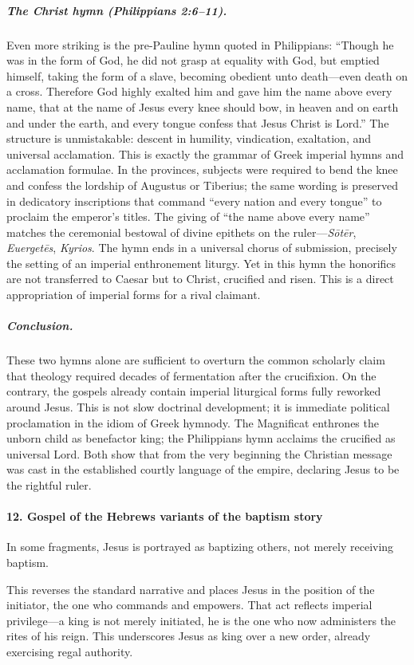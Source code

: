 \subparagraph{The Christ hymn (Philippians 2:6–11).}
Even more striking is the pre-Pauline hymn quoted in Philippians:
“Though he was in the form of God, he did not grasp at equality with God,
but emptied himself, taking the form of a slave,
becoming obedient unto death—even death on a cross.
Therefore God highly exalted him
and gave him the name above every name,
that at the name of Jesus every knee should bow,
in heaven and on earth and under the earth,
and every tongue confess that Jesus Christ is Lord.”
The structure is unmistakable: descent in humility, vindication, exaltation, and universal acclamation.
This is exactly the grammar of Greek imperial hymns and acclamation formulae.
In the provinces, subjects were required to bend the knee and confess the lordship of Augustus or Tiberius; the same wording is preserved in dedicatory inscriptions that command “every nation and every tongue” to proclaim the emperor’s titles.
The giving of “the name above every name” matches the ceremonial bestowal of divine epithets on the ruler—\emph{Sōtēr}, \emph{Euergetēs}, \emph{Kyrios}.
The hymn ends in a universal chorus of submission, precisely the setting of an imperial enthronement liturgy.
Yet in this hymn the honorifics are not transferred to Caesar but to Christ, crucified and risen.
This is a direct appropriation of imperial forms for a rival claimant.

\subparagraph{Conclusion.}
These two hymns alone are sufficient to overturn the common scholarly claim that theology required decades of fermentation after the crucifixion.
On the contrary, the gospels already contain imperial liturgical forms fully reworked around Jesus.
This is not slow doctrinal development; it is immediate political proclamation in the idiom of Greek hymnody.
The Magnificat enthrones the unborn child as benefactor king; the Philippians hymn acclaims the crucified as universal Lord.
Both show that from the very beginning the Christian message was cast in the established courtly language of the empire, declaring Jesus to be the rightful ruler.


\paragraph{12.
Gospel of the Hebrews variants of the baptism story}\label{par:gospel-of-the-hebrews-variants-of-the-baptism-story}

In some fragments, Jesus is portrayed as baptizing others, not merely receiving baptism.

This reverses the standard narrative and places Jesus in the position of the initiator, the one who commands and empowers.
That act reflects imperial privilege---a king is not merely initiated, he is the one who now administers the rites of his reign.
This underscores Jesus as king over a new order, already exercising regal authority.

